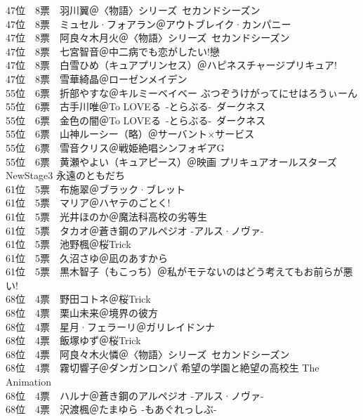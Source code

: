 {    47位　8票　羽川翼＠〈物語〉シリーズ~セカンドシーズン\\
    47位　8票　ミュセル·フォアラン＠アウトブレイク·カンパニー\\
    47位　8票　阿良々木月火＠〈物語〉シリーズ~セカンドシーズン\\
    47位　8票　七宮智音＠中二病でも恋がしたい!戀\\
    47位　8票　白雪ひめ（キュアプリンセス）＠ハピネスチャージプリキュア!\\
    47位　8票　雪華綺晶＠ローゼンメイデン\\
    55位　6票　折部やすな＠キルミーベイベー ぶつぞうけがってにせはろうぃーん\\
    55位　6票　古手川唯＠To LOVEる~-とらぶる-~ダークネス\\
    55位　6票　金色の闇＠To LOVEる~-とらぶる-~ダークネス\\
    55位　6票　山神ルーシー（略）＠サーバント×サービス\\
    55位　6票　雪音クリス＠戦姫絶唱シンフォギアG\\
    55位　6票　黄瀬やよい（キュアピース）＠映画 プリキュアオールスターズNewStage3 永遠のともだち\\
    61位　5票　布施翠＠ブラック·ブレット\\
    61位　5票　マリア＠ハヤテのごとく!\\
    61位　5票　光井ほのか＠魔法科高校の劣等生\\
    61位　5票　タカオ＠蒼き鋼のアルペジオ -アルス·ノヴァ-\\
    61位　5票　池野楓＠桜Trick\\
    61位　5票　久沼さゆ＠凪のあすから\\
    61位　5票　黒木智子（もこっち）＠私がモテないのはどう考えてもお前らが悪い!\\
    68位　4票　野田コトネ＠桜Trick\\
    68位　4票　栗山未来＠境界の彼方\\
    68位　4票　星月·フェラーリ＠ガリレイドンナ\\
    68位　4票　飯塚ゆず＠桜Trick\\
    68位　4票　阿良々木火憐＠〈物語〉シリーズ~セカンドシーズン\\
    68位　4票　霧切響子＠ダンガンロンパ 希望の学園と絶望の高校生 The Animation\\
    68位　4票　ハルナ＠蒼き鋼のアルペジオ -アルス·ノヴァ-\\
    68位　4票　沢渡楓＠たまゆら -もあぐれっしぶ-\\
}
